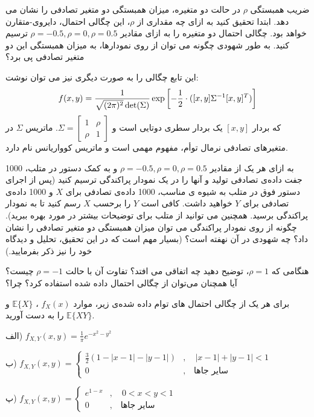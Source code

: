 ضریب همبستگی $\rho$ در حالت دو متغیره، میزان همبستگی دو متغیر تصادفی را نشان می دهد. ابتدا تحقیق کنید به ازای چه مقداری از $\rho$، این چگالی احتمال، دایروی-متقارن خواهد بود. چگالی احتمال دو متغیره را به ازای مقادیر 
$\rho=-0.5,\rho=0,\rho=0.5$
 ترسیم کنید. به طور شهودی چگونه می توان از روی نمودارها، به میزان همبستگی این دو متغیر تصادفی پی برد؟

این تابع چگالی را به صورت دیگری نیز می توان نوشت:
$$
f(x,y)={1\over \sqrt{(2\pi)^2}\det(\Sigma)}\exp\left[-{1\over 2}\cdot([x,y]\Sigma^{-1}[x,y]^T)\right]
$$
که بردار $[x,y]$ یک بردار سطری دوتایی است و 
$
\Sigma=\begin{bmatrix}
1&\rho\\
\rho&1
\end{bmatrix}
$.
ماتریس $\Sigma$ در متغیرهای تصادفی نرمال توأم، مفهوم مهمی است و ماتریس کوواریانس نام دارد.

به ازای هر یک از مقادیر 
$\rho=-0.5,\rho=0,\rho=0.5$
 و به کمک دستور 
 در متلب، 1000 جفت داده‌ی تصادفی تولید و آنها را در یک نمودار پراکندگی ترسیم کنید (پس از اجرای دستور فوق در متلب به شیوه ی مناسب، 1000 داده‌ی تصادفی برای $X$ و 1000 داده‌ی تصادفی برای $Y$ خواهید داشت. کافی است $Y$ را برحسب $X$ رسم کنید تا به نمودار پراکندگی برسید. همچنین می توانید از  متلب برای توضیحات بیشتر در مورد  بهره ببرید). چگونه از روی نمودار پراکندگی می توان میزان همبستگی دو متغیر تصادفی را نشان داد؟ چه شهودی در آن نهفته است؟ (بسیار مهم است که در این تحقیق، تحلیل و دیدگاه خود را نیز ذکر بفرمایید.)

هنگامی که $\rho=1$، توضیح دهید چه اتفاقی می افتد؟ تفاوت آن با حالت $\rho=-1$ چیست؟ آیا همچنان می‌توان از چگالی احتمال داده شده استفاده کرد؟ چرا؟


\Q
برای هر یک از چگالی احتمال های توام داده شده‌ی زیر، موارد 
$
f_X(x)
$
،
$
\mathbb{E}\{X\}
$
و
$
\mathbb{E}\{XY\}
$
را به دست آورید.

الف) 
$
f_{X,Y}(x,y)=\frac{1}{\pi}e^{-x^2-y^2}
$

ب) 
$
f_{X,Y}(x,y)=\begin{cases}
\frac{3}{2}(1-|x-1|-|y-1|)&,\quad |x-1|+|y-1|<1\\
0&,\quad \text{سایر جاها}
\end{cases}
$

پ)
$
f_{X,Y}(x,y)=\begin{cases}
e^{1-x}&,\quad 0<x<y<1\\
0&,\quad \text{سایر جاها}
\end{cases}
$

